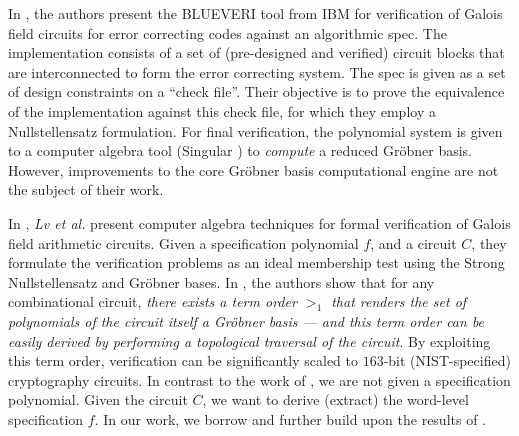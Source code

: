 In \cite{ibm:ecc-ita11}
\cite{blueveri:ita} \cite{ibm:blueveri},
the authors present the {\sc BLUEVERI} tool from IBM for verification
of Galois field circuits for error correcting codes against an
algorithmic spec. The implementation consists of a set of
(pre-designed and verified) circuit blocks that are interconnected to
form the error correcting system. The spec is given as a set of design
constraints on a ``check file''. Their objective is to prove the 
equivalence of the implementation against this check file,
for which they employ a Nullstellensatz formulation.
For final verification, the polynomial system is given
to a computer algebra tool ({\sc Singular} \cite{DGPS}) to {\it
  compute} a reduced Gr\"obner basis. However, improvements to the
core Gr\"obner basis computational engine are not the subject of their
work.   

In \cite{lv:phd} \cite{lv:date2012} \cite{lv:hldvt2011}
\cite{lv:vlsi2012}, {\it Lv et al.} present computer algebra
techniques for formal verification of Galois field arithmetic
circuits. Given a specification polynomial $f$, and a circuit $C$,
they formulate the verification problems as an ideal membership test
using the Strong Nullstellensatz and Gr\"obner bases. In \cite{lv:date2012}, the
authors show that for any combinational circuit, {\it there exists
a term order $>_1$ that renders the set of polynomials of the circuit
itself a Gr\"obner basis --- and this term order can be easily derived
by performing a topological traversal of the circuit}. By exploiting
this term order, verification can be significantly scaled
to $163$-bit (NIST-specified) cryptography circuits. 
In contrast to the work of \cite{lv:phd}, we are not given a
specification polynomial. Given the circuit $C$, we want
to derive (extract) the word-level specification $f$. In our work, we
borrow and further build upon the results of \cite{gao:gf-gb-ms}
\cite{gao:qe-gf-gb} %
\cite{lv:date2012} \cite{lv:phd}. 


